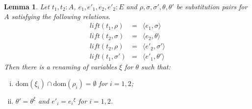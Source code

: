 \documentclass{article}
\newtheorem{lemma}[definition]{Lemma}
\newcommand{\lift}{\ensuremath{\mathit{lift}}}
\newcommand{\dom}{\ensuremath{\mathrm{dom}}}
\newcommand{\renamevar}[2]{\ensuremath{{#1}^{#2}}}
\newcommand{\isrenamevar}[3]{\ensuremath{{#1}=\renamevar{#2}{#3}}}
\begin{document}
\begin{lemma}\label{liftcommutes}
Let $t_1,t_2:A$, $e_1,e'_1,e_2,e'_2:E$ and
$\rho,\sigma,\sigma',\theta,\theta'$ be substitution pairs for $A$
satisfying the following relations.
\begin{eqnarray*}
\lift(t_1,\rho) & = & \langle e_1,\sigma\rangle\\
\lift(t_2,\sigma) & = & \langle e_2,\theta\rangle\\
\lift(t_2,\rho) & = & \langle e'_2,\sigma'\rangle\\
\lift(t_1,\sigma') & = & \langle e'_1,\theta'\rangle
\end{eqnarray*}
Then there is a renaming of variables $\xi$ for $\theta$ such that:
\begin{enumerate}[(i)]
\item\label{domxi} $\dom(\xi_i)\cap\dom(\rho_i)=\emptyset$ for $i=1,2$;
\item\label{replxi} {\isrenamevar{\theta'}\theta\xi} and
{\isrenamevar{e'_i}{e_i}\xi} for $i=1,2$.
\end{enumerate}
\end{lemma}
\end{document}
